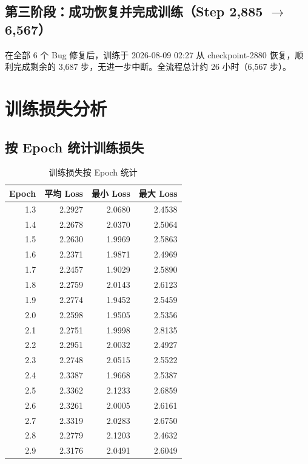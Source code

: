 \documentclass[12pt,a4paper]{ctexart}
\begin{document}
\subsection{第三阶段：成功恢复并完成训练（Step 2,885 $\to$ 6,567）}

在全部 6 个 Bug 修复后，训练于 2026-08-09 02:27 从 checkpoint-2880 恢复，顺利完成剩余的 3,687 步，无进一步中断。全流程总计约 26 小时（6,567 步）。

\section{训练损失分析}

\subsection{按 Epoch 统计训练损失}

\begin{table}[htbp]\centering
\caption{训练损失按 Epoch 统计}
\begin{tabular}{@{}rrrr@{}}
\toprule
\textbf{Epoch} & \textbf{平均 Loss} & \textbf{最小 Loss} & \textbf{最大 Loss} \\
\midrule
1.3 & 2.2927 & 2.0680 & 2.4538 \\
1.4 & 2.2678 & 2.0370 & 2.5064 \\
1.5 & 2.2630 & 1.9969 & 2.5863 \\
1.6 & 2.2371 & 1.9871 & 2.4969 \\
1.7 & 2.2457 & 1.9029 & 2.5890 \\
1.8 & 2.2759 & 2.0143 & 2.6123 \\
1.9 & 2.2774 & 1.9452 & 2.5459 \\
2.0 & 2.2598 & 1.9505 & 2.5356 \\
2.1 & 2.2751 & 1.9998 & 2.8135 \\
2.2 & 2.2951 & 2.0032 & 2.4927 \\
2.3 & 2.2748 & 2.0515 & 2.5522 \\
2.4 & 2.3387 & 1.9668 & 2.5387 \\
2.5 & 2.3362 & 2.1233 & 2.6859 \\
2.6 & 2.3261 & 2.0005 & 2.6161 \\
2.7 & 2.3319 & 2.0283 & 2.6750 \\
2.8 & 2.2779 & 2.1203 & 2.4632 \\
2.9 & 2.3176 & 2.0491 & 2.6049 \\
\bottomrule
\end{tabular}
\end{table}
\end{document}

